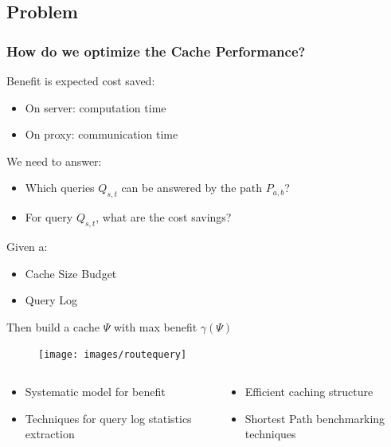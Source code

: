 \subsection{Problem}
\begin{frame}[red] %
\frametitle{How do we optimize the Cache Performance?}

  Benefit is expected cost saved:
    \begin{itemize}
    \item On server: computation time
    \item On proxy: communication time
    \end{itemize}

\vspace{1.5em}

We need to answer:
\begin{itemize}
    \item Which queries $Q_{s,t}$ can be answered by the path $P_{a,b}$?
    \item For query $Q_{s,t}$, what are the cost savings?
\end{itemize}

\vspace{1.5em}
  Given a: 
    \begin{itemize}
    \item Cache Size Budget 
    \item Query Log
    \end{itemize}
  Then build a cache $\Psi$ with max benefit $\gamma(\Psi)$\\
\end{frame}


\begin{frame}[color=red] %
    \begin{figure}
    \texttt{[image: images/routequery]} 
    \
    \end{figure}

\begin{columns}
  \begin{column}{0.5\textwidth}
    \vspace{-0.8em}
    \begin{itemize}
    \itemsep -2pt
      \item Systematic model for benefit
      \item Techniques for query log statistics extraction 
    \end{itemize}
  \end{column}
  \begin{column}{0.6\textwidth}
    \vspace{-1.3em}
    \begin{itemize}
     \itemsep -2pt
      \item Efficient caching structure
      \item Shortest Path benchmarking techniques
    \end{itemize}
  \end{column}
\end{columns}
\end{frame}




